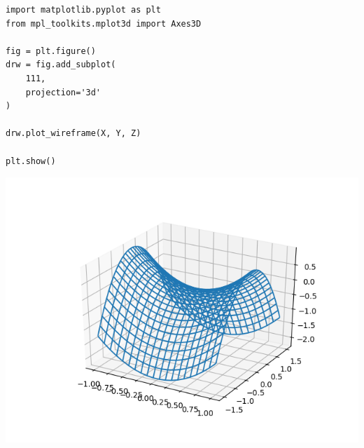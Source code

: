 
\begin{frame}[fragile]
%
\begin{tcbraster}[raster columns=2,
                  raster equal height,
                  nobeforeafter,
                  raster column skip=0.2cm]
\begin{codebox}
\begin{verbatim}
import matplotlib.pyplot as plt
from mpl_toolkits.mplot3d import Axes3D

fig = plt.figure()
drw = fig.add_subplot(
    111,
    projection='3d'
)

drw.plot_wireframe(X, Y, Z)

plt.show()
\end{verbatim}
\end{codebox}
%
\begin{tcolorbox}[title=Output: Wireframe]
	\includegraphics[width=\linewidth]{./gfx/plt-wireframe}
\end{tcolorbox}
\end{tcbraster}
%
\end{frame}


